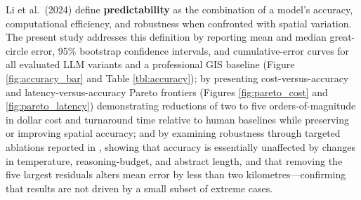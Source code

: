 Li et al.~(2024) define \textbf{predictability} as the combination of a
model's accuracy, computational efficiency, and robustness when
confronted with spatial variation. The present study addresses this
definition by reporting mean and median great-circle error, 95\%
bootstrap confidence intervals, and cumulative-error curves for all
evaluated LLM variants and a professional GIS baseline (Figure
\ref{fig:accuracy_bar} and Table \ref{tbl:accuracy}); by presenting
cost-versus-accuracy and latency-versus-accuracy Pareto frontiers
(Figures \ref{fig:pareto_cost} and \ref{fig:pareto_latency})
demonstrating reductions of two to five orders-of-magnitude in dollar
cost and turnaround time relative to human baselines while preserving or
improving spatial accuracy; and by examining robustness through targeted
ablations reported in \DIFdelbegin {}\DIFdelend \DIFaddbegin {}, showing that accuracy is essentially
unaffected by changes in temperature, reasoning-budget, and abstract
length, and that removing the five largest residuals alters mean error
by less than two kilometres---confirming that results are not driven by
a small subset of extreme cases.

